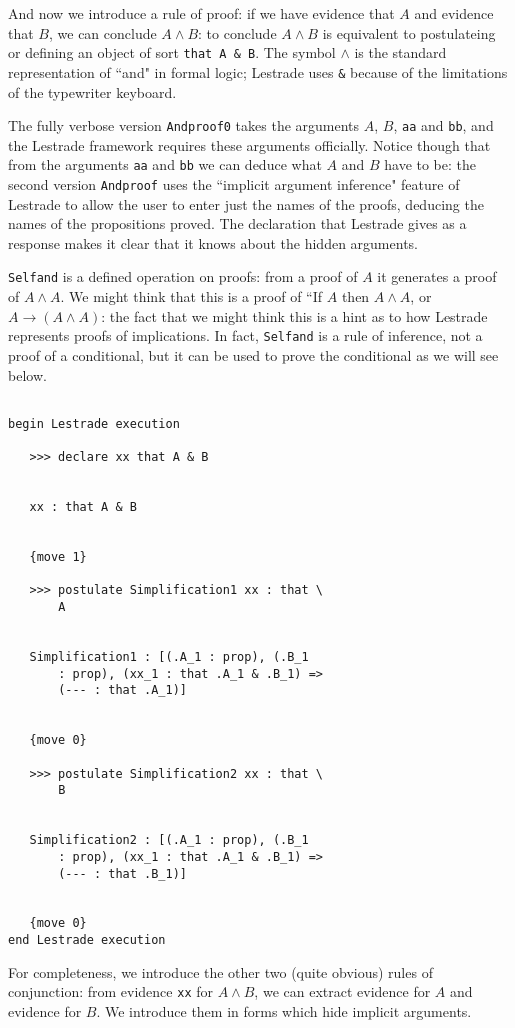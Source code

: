 \documentclass[12pt]{article}
\begin{document}
And now we introduce a rule of proof:  if we have evidence that $A$ and evidence that $B$, we can conclude $A \wedge B$:  to conclude $A \wedge B$ is equivalent to postulateing or defining an object of sort {\tt that A \& B}.  The symbol $\wedge$ is the standard representation of ``and" in formal logic; Lestrade uses {\tt \&} because of the limitations of the typewriter keyboard.

The fully verbose version {\tt Andproof0} takes the arguments $A$, $B$, {\tt aa} and {\tt bb}, and the Lestrade framework requires these arguments officially.  Notice though that from the arguments {\tt aa} and {\tt bb} we can deduce what $A$ and $B$ have to be:  the second version {\tt Andproof} uses the
``implicit argument inference" feature of Lestrade to allow the user to enter just the names of the proofs, deducing the names of the propositions proved.  The declaration that Lestrade gives as a response makes it clear that it knows about the hidden arguments.

{\tt Selfand} is a defined operation on proofs:  from a proof of $A$ it generates a proof of $A \wedge A$.  We might think that this is a proof of ``If $A$ then $A\wedge A$, or $A  \rightarrow (A\wedge A)$:  the fact that we might think this is a hint as to how Lestrade represents proofs of implications.  In fact, {\tt Selfand} is a rule of inference, not a proof of a conditional, but it can be used to prove the conditional as we will see below.

\begin{verbatim}

begin Lestrade execution

   >>> declare xx that A & B


   xx : that A & B


   {move 1}

   >>> postulate Simplification1 xx : that \
       A


   Simplification1 : [(.A_1 : prop), (.B_1 
       : prop), (xx_1 : that .A_1 & .B_1) => 
       (--- : that .A_1)]


   {move 0}

   >>> postulate Simplification2 xx : that \
       B


   Simplification2 : [(.A_1 : prop), (.B_1 
       : prop), (xx_1 : that .A_1 & .B_1) => 
       (--- : that .B_1)]


   {move 0}
end Lestrade execution
\end{verbatim}

For completeness, we introduce the other two (quite obvious) rules of conjunction:  from evidence {\tt xx} for $A \wedge B$, we can extract evidence for $A$ and evidence for $B$.  We introduce them in forms which hide implicit arguments.
\end{document}

